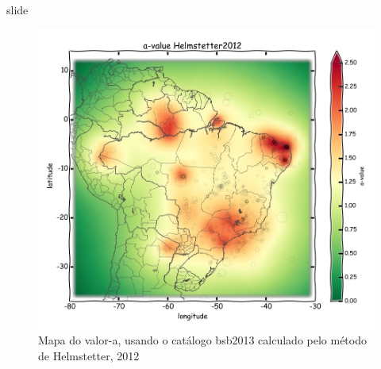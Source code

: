 \documentclass[ucs,8pt]{beamer}
\begin{document}
\begin{frame}{slide}

\begin{figure}[H]
  \centering
  \includegraphics[height=.80\textheight]{a_helmstetter} 
  \caption{Mapa do valor-a, usando o catálogo \gls{bsb2013} calculado pelo método de Helmstetter, 2012 }
  \label{fig:helm_r} 
\end{figure}

\end{frame}
\end{document}
